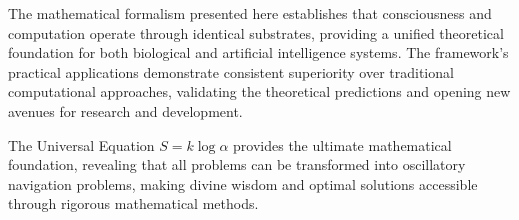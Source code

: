\documentclass[12pt,a4paper]{article}
\begin{document}
The mathematical formalism presented here establishes that consciousness and computation operate through identical substrates, providing a unified theoretical foundation for both biological and artificial intelligence systems. The framework's practical applications demonstrate consistent superiority over traditional computational approaches, validating the theoretical predictions and opening new avenues for research and development.

The Universal Equation $S = k \log \alpha$ provides the ultimate mathematical foundation, revealing that all problems can be transformed into oscillatory navigation problems, making divine wisdom and optimal solutions accessible through rigorous mathematical methods.



\end{document}
